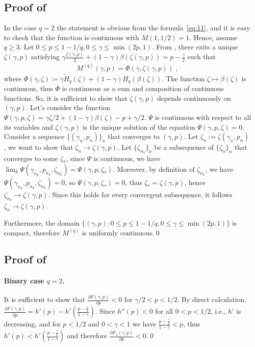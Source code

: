 \documentclass{article}
\theoremstyle{plain}
\theoremstyle{plain}
\theoremstyle{plain}
\theoremstyle{plain}
\theoremstyle{plain}
\theoremstyle{plain}
\theoremstyle{plain}
\theoremstyle{plain}
\theoremstyle{plain}
\theoremstyle{plain}
\theoremstyle{remark}
\theoremstyle{remark}
\theoremstyle{remark}
\theoremstyle{plain}
\begin{document}
\subsection{Proof of }
In the case $q=2$ the statement is obvious
from the formula~\eqref{eq:11},
and it is easy to check that the function
is continuous with $M(1,1/2)=1$.
Hence, assume $q\ge 3$.
Let $0\le p\le1-1/q, 0\le \gamma\le\min(2p,1)$. From , there exits a unique $\zeta(\gamma,p)$ satisfying $\gamma\frac{\zeta(\gamma,p)}{2}+(1-\gamma)\beta(\zeta(\gamma,p))=p-\frac{\gamma}{2}$ such that 
\begin{align*}
            M^{(q)}(\gamma,p)=\Phi(\gamma,\zeta(\gamma,p))\;,
        \end{align*}
where $\Phi(\gamma,\zeta)\coloneqq\gamma\tilde{H}_q(\zeta)+(1-\gamma)H_q(\beta(\zeta))$. The function $\zeta\mapsto\beta(\zeta)$ is continuous, thus $\Phi$ is continuous as a sum and composition of continuous functions. So, it is sufficient to show that $\zeta(\gamma,p)$ depends continuously on $(\gamma,p)$. Let's consider the function $\Psi(\gamma,p,\zeta)= \gamma\zeta/2+(1-\gamma)\beta(\zeta)-p+\gamma/2$. $\Psi$ is continuous with respect to all its variables and $\zeta(\gamma,p)$ is the unique solution of the equation $\Psi(\gamma,p,\zeta)=0$. Consider a sequence $\{(\gamma_n,p_n)\}_n$ that converges to $(\gamma,p)$. Let $\zeta_n:=\zeta(\gamma_n,p_n)$, we want to show that $\zeta_n\to\zeta(\gamma,p)$. Let $\{\zeta_{n_k}\}_k$ be a subsequence of $\{\zeta_n\}_n$ that converges to some $\zeta_*$, since $\Psi$ is continuous, we have $\lim_k \Psi(\gamma_{n_k},p_{n_k},\zeta_{n_k})= \Psi(\gamma,p,\zeta_*)$. Moreover, by definition  of $\zeta_{n_k}$, we have $\Psi(\gamma_{n_k},p_{n_k},\zeta_{n_k})=0$, so $\Psi(\gamma,p,\zeta_*)=0$, thus $\zeta_*=\zeta(\gamma,p)$, hence $\zeta_{n_k}\to\zeta(\gamma,p)$.
Since this holds for every convergent
subsequence, it follows
$\zeta_n\to\zeta(\gamma,p)$.

Furthermore, the domain $\{(\gamma,p): 0\le p\le1-1/q, 0\le \gamma\le\min(2p,1)\}$ is compact, therefore $M^{(q)}$ is uniformly continuous.\qed

\subsection{Proof of }
\paragraph{Binary case $q=2$.}
It is sufficient to show that $\frac{\partial F(\gamma,p)}{\partial p}< 0$
        for $\gamma/2<p<1/2$.
        By direct calculation, $\frac{\partial F(\gamma,p)}{\partial p}=h'(p)-h'\left(\frac{p-\frac{\gamma}{2}}{1-\gamma}\right)$. Since $h''(p)<0$ for all $0<p<1/2$, i.e., $h'$ is decreasing, and for $p<1/2$ and
        $0<\gamma<1$ we have  $\frac{p-\frac{\gamma}{2}}{1-\gamma}< p$, thus $h'(p)<h'\left(\frac{p-\frac{\gamma}{2}}{1-\gamma}\right)$ and therefore $\frac{\partial F_{\lambda}(\gamma,p)}{\partial p}<0$.\qed
\end{document}
